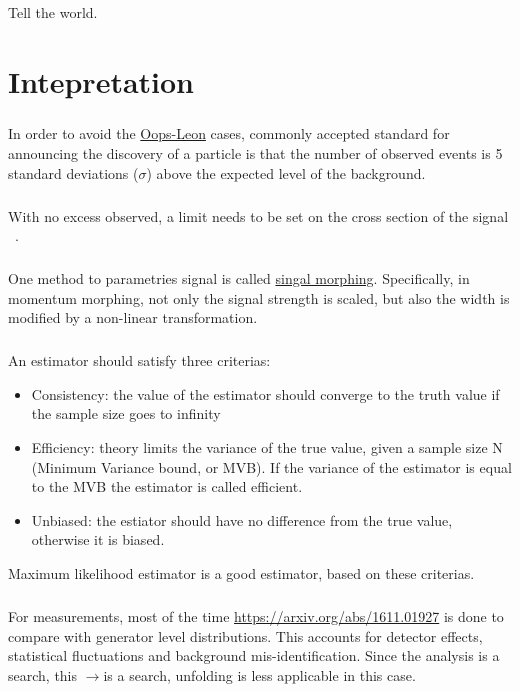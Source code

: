 \begin{savequote}[75mm]
Tell the world.
\end{savequote}

\chapter{Intepretation}

\paragraph{}
In order to avoid the \href{https://en.wikipedia.org/wiki/Oops-Leon}{Oops-Leon} cases, commonly accepted standard for announcing the discovery of a particle is that the number of observed events is 5 standard deviations ($\sigma$) above the expected level of the background.

\paragraph{}
With no excess observed, a limit needs to be set on the cross section of the signal ~\cite{Stat-asym}. 

\paragraph{}
One method to parametries signal is called \href{https://arxiv.org/abs/1410.7388}{singal morphing}. Specifically, in momentum morphing, not only the signal strength is scaled, but also the width is modified by a non-linear transformation. 

\paragraph{}
An estimator should satisfy three criterias:
\begin{itemize}
	\item Consistency: the value of the estimator should converge to the truth value if the sample size goes to infinity
	\item Efficiency: theory limits the variance of the true value, given a sample size N (Minimum Variance bound, or MVB). If the variance of the estimator is equal to the MVB the estimator is called efficient.
	\item Unbiased: the estiator should have no difference from the true value, otherwise it is biased.
\end{itemize}
Maximum likelihood estimator is a good estimator, based on these criterias.

\paragraph{}
For measurements, most of the time \href{unfolding}{https://arxiv.org/abs/1611.01927} is done to compare with generator level distributions. This accounts for detector effects, statistical fluctuations and background mis-identification. Since the analysis is a search, this \hh$\to$\fourb is a search, unfolding is less applicable in this case.